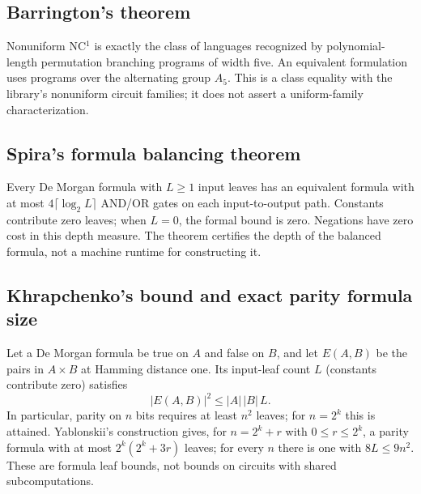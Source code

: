 \begin{result}
\subsection{Barrington's theorem}
Nonuniform NC$^1$ is exactly the class of languages recognized by polynomial-length
permutation branching programs of width five. An equivalent formulation uses
programs over the alternating group $A_5$. This is a class equality with the
library's nonuniform circuit families; it does not assert a uniform-family
characterization.\citep{Barrington1989,BarringtonTherien1988}
\end{result}

\begin{result}
\subsection{Spira's formula balancing theorem}
Every De Morgan formula with $L\ge1$ input leaves has an equivalent formula with
at most $4\lceil\log_2 L\rceil$ AND/OR gates on each input-to-output path.
Constants contribute zero leaves; when $L=0$, the formal bound is zero. Negations have
zero cost in this depth measure. The theorem certifies the depth of the balanced
formula, not a machine runtime for constructing it.\citep{Spira1971}
\end{result}

\begin{result}
\subsection{Khrapchenko's bound and exact parity formula size}
Let a De Morgan formula be true on $A$ and false on $B$, and let $E(A,B)$ be the
pairs in $A\times B$ at Hamming distance one. Its input-leaf count $L$ (constants contribute zero) satisfies
\[
|E(A,B)|^2\le |A|\,|B|\,L.
\]
In particular, parity on $n$ bits requires at least $n^2$ leaves; for $n=2^k$
this is attained. Yablonskii's construction gives, for $n=2^k+r$ with
$0\le r\le2^k$, a parity formula with at most $2^k(2^k+3r)$ leaves;
for every $n$ there is one with $8L\le9n^2$.
These are formula leaf bounds, not bounds on circuits with shared subcomputations.
\citep{Khrapchenko1971b,Khrapchenko1971,Yablonskii1954,Jukna2012}
\end{result}

